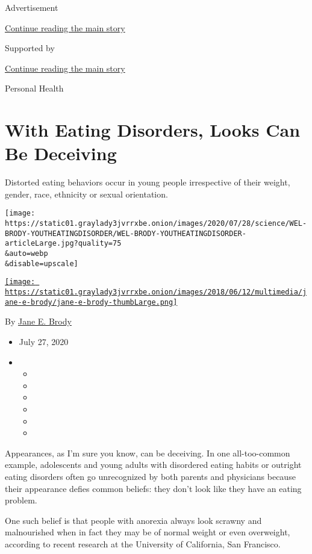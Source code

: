 Advertisement

\protect\hyperlink{after-top}{Continue reading the main story}

Supported by

\protect\hyperlink{after-sponsor}{Continue reading the main story}

Personal Health

\hypertarget{with-eating-disorders-looks-can-be-deceiving}{%
\section{With Eating Disorders, Looks Can Be
Deceiving}\label{with-eating-disorders-looks-can-be-deceiving}}

Distorted eating behaviors occur in young people irrespective of their
weight, gender, race, ethnicity or sexual orientation.

\texttt{[image: https://static01.graylady3jvrrxbe.onion/images/2020/07/28/science/WEL-BRODY-YOUTHEATINGDISORDER/WEL-BRODY-YOUTHEATINGDISORDER-articleLarge.jpg?quality=75\\\&auto=webp\\\&disable=upscale]}

\href{https://www.nytimes3xbfgragh.onion/by/jane-e-brody}{\texttt{[image: https://static01.graylady3jvrrxbe.onion/images/2018/06/12/multimedia/jane-e-brody/jane-e-brody-thumbLarge.png]}}

By \href{https://www.nytimes3xbfgragh.onion/by/jane-e-brody}{Jane E.
Brody}

\begin{itemize}
\item
  July 27, 2020
\item
  \begin{itemize}
  \item
  \item
  \item
  \item
  \item
  \item
  \end{itemize}
\end{itemize}

Appearances, as I'm sure you know, can be deceiving. In one
all-too-common example, adolescents and young adults with disordered
eating habits or outright eating disorders often go unrecognized by both
parents and physicians because their appearance defies common beliefs:
they don't look like they have an eating problem.

One such belief is that people with anorexia always look scrawny and
malnourished when in fact they may be of normal weight or even
overweight, according to recent research at the University of
California, San Francisco.

